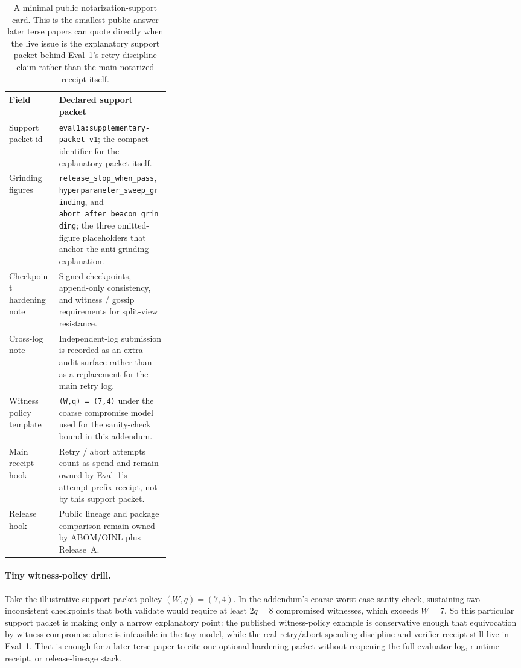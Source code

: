 \documentclass[11pt]{article}
\begin{document}
\begin{table}[t]
\centering
\begin{tabularx}{0.97\linewidth}{@{}>{\raggedright\arraybackslash}p{0.31\linewidth}>{\raggedright\arraybackslash}X@{}}
\toprule
\textbf{Field} & \textbf{Declared support packet} \\
\midrule
Support packet id & \texttt{eval1a:supplementary-packet-v1}; the compact identifier for the explanatory packet itself. \\
Grinding figures & \texttt{release\_stop\_when\_pass}, \texttt{hyperparameter\_sweep\_grinding}, and \texttt{abort\_after\_beacon\_grinding}; the three omitted-figure placeholders that anchor the anti-grinding explanation. \\
Checkpoint hardening note & Signed checkpoints, append-only consistency, and witness / gossip requirements for split-view resistance. \\
Cross-log note & Independent-log submission is recorded as an extra audit surface rather than as a replacement for the main retry log. \\
Witness policy template & \texttt{(W,q) = (7,4)} under the coarse compromise model used for the sanity-check bound in this addendum. \\
Main receipt hook & Retry / abort attempts count as spend and remain owned by Eval~1's attempt-prefix receipt, not by this support packet. \\
Release hook & Public lineage and package comparison remain owned by ABOM/OINL plus Release~A. \\
\bottomrule
\end{tabularx}
\caption{A minimal public notarization-support card. This is the smallest public answer later terse papers can quote directly when the live issue is the explanatory support packet behind Eval~1's retry-discipline claim rather than the main notarized receipt itself.}
\label{tab:eval1a-card}
\end{table}

\paragraph{Tiny witness-policy drill.}
Take the illustrative support-packet policy \((W,q)=(7,4)\).
In the addendum's coarse worst-case sanity check, sustaining two inconsistent checkpoints that both validate would require at least $2q=8$ compromised witnesses, which exceeds $W=7$.
So this particular support packet is making only a narrow explanatory point: the published witness-policy example is conservative enough that equivocation by witness compromise alone is infeasible in the toy model, while the real retry/abort spending discipline and verifier receipt still live in Eval~1.
That is enough for a later terse paper to cite one optional hardening packet without reopening the full evaluator log, runtime receipt, or release-lineage stack.
\end{document}
